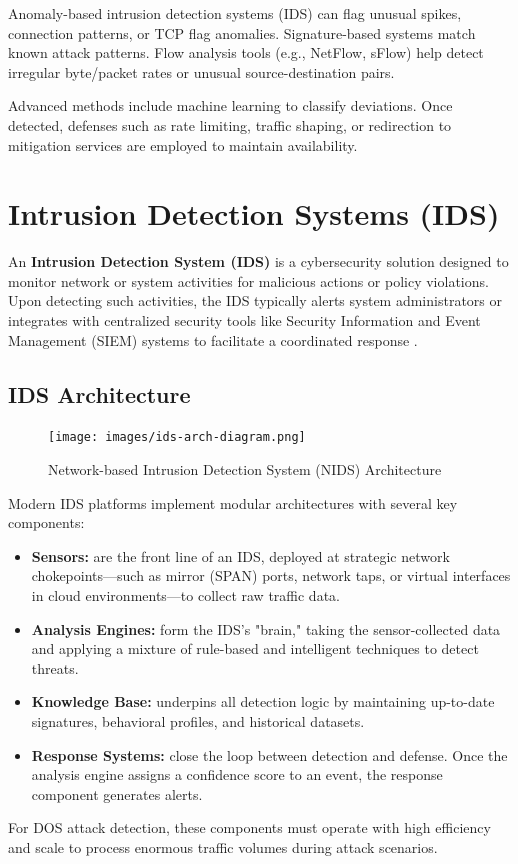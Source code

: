 \documentclass[12pt]{report}
\begin{document}
Anomaly-based intrusion detection systems (IDS) can flag unusual spikes, connection patterns, or TCP flag anomalies. Signature-based systems match known attack patterns. Flow analysis tools (e.g., NetFlow, sFlow) help detect irregular byte/packet rates or unusual source-destination pairs.

Advanced methods include machine learning to classify deviations. Once detected, defenses such as rate limiting, traffic shaping, or redirection to mitigation services are employed to maintain availability.

\section{Intrusion Detection Systems (IDS)}
An \textbf{Intrusion Detection System (IDS)} is a cybersecurity solution designed to monitor network or system activities for malicious actions or policy violations. Upon detecting such activities, the IDS typically alerts system administrators or integrates with centralized security tools like Security Information and Event Management (SIEM) systems to facilitate a coordinated response \cite{ibm_ids}.

\subsection{IDS Architecture}
\begin{figure}[H]
    \centering
    \texttt{[image: images/ids-arch-diagram.png]}
    \caption{Network-based Intrusion Detection System (NIDS) Architecture}
    \label{fig:nids-architecture}
\end{figure}

Modern IDS platforms implement modular architectures with several key components:
\begin{itemize}
    \item \textbf{Sensors:} are the front line of an IDS, deployed at strategic network chokepoints—such as mirror (SPAN) ports, network taps, or virtual interfaces in cloud environments—to collect raw traffic data.
    \item \textbf{Analysis Engines:} form the IDS's "brain," taking the sensor-collected data and applying a mixture of rule-based and intelligent techniques to detect threats.
    \item \textbf{Knowledge Base:} underpins all detection logic by maintaining up-to-date signatures, behavioral profiles, and historical datasets.
    \item \textbf{Response Systems:} close the loop between detection and defense. Once the analysis engine assigns a confidence score to an event, the response component generates alerts.
\end{itemize}
For DOS attack detection, these components must operate with high efficiency and scale to process enormous traffic volumes during attack scenarios.
\end{document}
